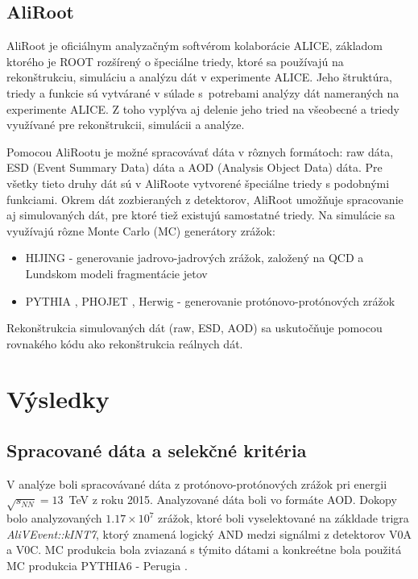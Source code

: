\documentclass[thesismargins, thesislinespacing]{rnthesis}
\begin{document}
\section{AliRoot}
AliRoot \cite{aliroot} je oficiálnym analyzačným softvérom kolaborácie ALICE, základom ktorého je ROOT rozšírený o špeciálne triedy, ktoré sa používajú na rekonštrukciu, simuláciu a analýzu dát v experimente ALICE. Jeho štruktúra, triedy a funkcie sú vytvárané v súlade s~potrebami analýzy dát nameraných na experimente ALICE. Z toho vyplýva aj delenie jeho tried na všeobecné a triedy využívané pre rekonštrukcii, simulácii a analýze. 

Pomocou AliRootu je možné spracovávať dáta v rôznych formátoch: raw dáta, ESD (Event Summary Data) dáta a AOD (Analysis Object Data) dáta.
Pre všetky tieto druhy dát sú v AliRoote vytvorené špeciálne triedy s podobnými funkciami. Okrem dát zozbieraných z detektorov, AliRoot umožňuje spracovanie aj simulovaných dát, pre ktoré tiež existujú samostatné triedy. Na simulácie sa využívajú rôzne Monte Carlo (MC) generátory zrážok:
\begin{itemize}
	\item HIJING \cite{hijing} - generovanie jadrovo-jadrových zrážok, založený na QCD a Lundskom modeli fragmentácie jetov
	\item PYTHIA \cite{pythia}, PHOJET \cite{phojet}, Herwig \cite{herwig} - generovanie protónovo-protónových zrážok
\end{itemize}

Rekonštrukcia simulovaných dát (raw, ESD, AOD) sa uskutočňuje pomocou rovnakého kódu ako rekonštrukcia reálnych dát.

\chapter{Výsledky}

\section{Spracované dáta a selekčné kritéria}
V analýze boli spracovávané dáta z protónovo-protónových zrážok pri energii $\sqrt{s_{NN}}=13$~TeV z roku 2015. Analyzované dáta boli vo formáte AOD. Dokopy bolo analyzovaných $1.17\times10^7$ zrážok, ktoré boli vyselektované na zákldade trigra \textit{AliVEvent::kINT7}, ktorý znamená logický AND medzi signálmi z detektorov V0A a V0C.
MC produkcia bola zviazaná s týmito dátami a konkreétne bola použitá MC produkcia PYTHIA6 - Perugia \cite{perugia}. 
\end{document}
